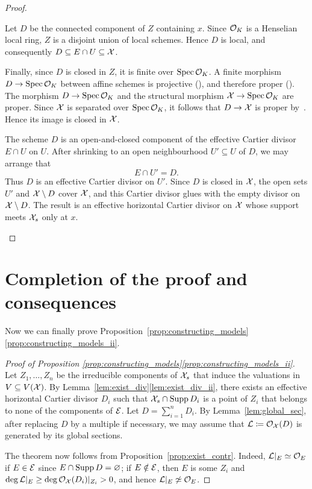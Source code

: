 \begin{proof}
\begin{enumerate}[label=\textup{(\roman*)}]
            Let $D$ be the connected component of $Z$ containing $x$.
            Since $\mathcal{O}_{K}$ is a Henselian local ring, $Z$ is a disjoint union of local schemes.
            Hence $D$ is local, and consequently $D \subseteq E \cap U \subseteq \mathcal X$.

            Finally, since $D$ is closed in $Z$, it is finite over $\operatorname{Spec} \mathcal{O}_K$.
            A finite morphism $D \to \operatorname{Spec} \mathcal{O}_K$ between affine schemes is projective (\cite[Exercise 3.3.22]{Liu}),
            and therefore proper (\cite[Theorem 3.3.30]{Liu}).
            The morphism $D\to\operatorname{Spec}\mathcal{O}_K$ and the structural morphism $\mathcal X\to\operatorname{Spec}\mathcal{O}_K$ are proper.
            Since $\mathcal X$ is separated over $\operatorname{Spec}\mathcal{O}_K$, it follows that $D\to\mathcal X$ is proper by~\cite[Proposition 3.3.16(e)]{Liu}.
            Hence its image is closed in $\mathcal X$.

            The scheme $D$ is an open-and-closed component of the effective Cartier divisor $E\cap U$ on $U$.
            After shrinking to an open neighbourhood $U'\subseteq U$ of $D$, we may arrange that
            \[
                E\cap U'=D.
            \]
            Thus $D$ is an effective Cartier divisor on $U'$.
            Since $D$ is closed in $\mathcal X$, the open sets $U'$ and $\mathcal X\setminus D$ cover $\mathcal X$, and this Cartier divisor glues with the empty divisor on $\mathcal X\setminus D$.
            The result is an effective horizontal Cartier divisor on $\mathcal X$ whose support meets $\mathcal X_s$ only at $x$.
    \end{enumerate}
\end{proof}


\section{Completion of the proof and consequences}\label{sec:completion-correspondence-proof}
Now we can finally prove Proposition~\ref{prop:constructing_models}\ref{prop:constructing_models_ii}.

\begin{proof}[Proof of Proposition \ref{prop:constructing_models}\ref{prop:constructing_models_ii}]
    Let $Z_1, \dots, Z_n$ be the irreducible components of $\mathcal X_s$ that induce the valuations in $V \subseteq V(\mathcal X)$.
    By Lemma~\ref{lem:exist_div}\ref{lem:exist_div_ii}, there exists an effective horizontal Cartier divisor $D_i$
    such that $\mathcal X_s \cap \operatorname{Supp} D_i$ is a point of $Z_i$ that belongs to none of the components of $\mathcal{E}$.
    Let $D = \sum_{i=1}^n D_i$.
    By Lemma~\ref{lem:global_sec}, after replacing $D$ by a multiple if necessary, we may assume that
    $\mathcal{L} \coloneqq \mathcal{O}_\mathcal X(D)$ is generated by its global sections.

    The theorem now follows from Proposition~\ref{prop:exist_contr}.
    Indeed, \(\mathcal{L}|_E \simeq \mathcal{O}_E\) if $E \in \mathcal{E}$ since $E \cap \operatorname{Supp} D = \varnothing$;
    if $E \notin \mathcal{E}$, then $E$ is some $Z_i$ and $\deg \mathcal{L}|_E \geq \deg \mathcal{O}_\mathcal X(D_i)|_{Z_i} > 0$, and hence \(\mathcal{L}|_E \not\simeq \mathcal{O}_E\).
\end{proof}

